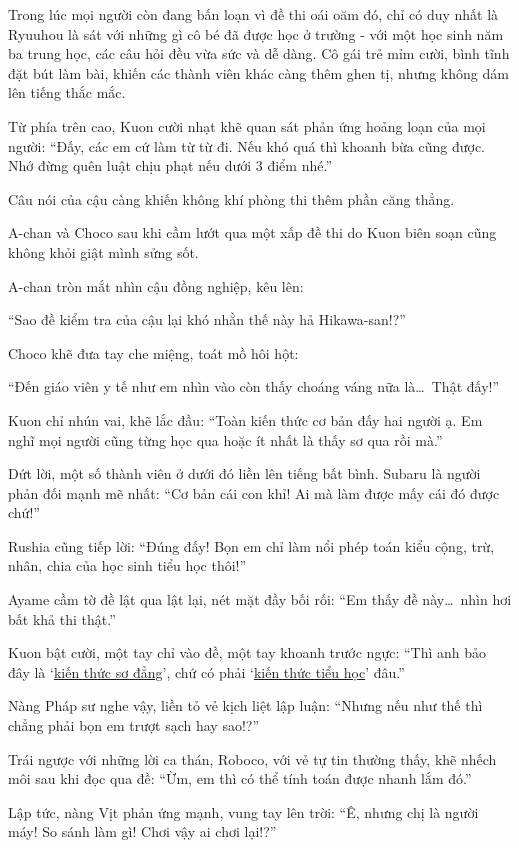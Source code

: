 \documentclass[../main.tex]{subfiles}
\begin{document}
Trong lúc mọi người còn đang bấn loạn vì đề thi oái oăm đó, chỉ có duy nhất là Ryuuhou là sát với những gì cô bé đã được học ở trường - với một học sinh năm ba trung học, các câu hỏi đều vừa sức và dễ dàng. Cô gái trẻ mỉm cười, bình tĩnh đặt bút làm bài, khiến các thành viên khác càng thêm ghen tị, nhưng không dám lên tiếng thắc mắc.

Từ phía trên cao, Kuon cười nhạt khẽ quan sát phản ứng hoảng loạn của mọi người: ``Đấy, các em cứ làm từ từ đi. Nếu khó quá thì khoanh bừa cũng được. Nhớ đừng quên luật chịu phạt nếu dưới 3 điểm nhé.''

Câu nói của cậu càng khiến không khí phòng thi thêm phần căng thẳng.

A-chan và Choco sau khi cầm lướt qua một xấp đề thi do Kuon biên soạn cũng không khỏi giật mình sửng sốt.

A-chan tròn mắt nhìn cậu đồng nghiệp, kêu lên:

``Sao đề kiểm tra của cậu lại khó nhằn thế này hả Hikawa-san!?''

Choco khẽ đưa tay che miệng, toát mồ hôi hột:

``Đến giáo viên y tế như em nhìn vào còn thấy choáng váng nữa là\dots\ Thật đấy!''

Kuon chỉ nhún vai, khẽ lắc đầu: ``Toàn kiến thức cơ bản đấy hai người ạ. Em nghĩ mọi người cũng từng học qua hoặc ít nhất là thấy sơ qua rồi mà.''

Dứt lời, một số thành viên ở dưới đó liền lên tiếng bất bình. Subaru là người phản đối mạnh mẽ nhất: ``Cơ bản cái con khỉ! Ai mà làm được mấy cái đó được chứ!''

Rushia cũng tiếp lời: ``Đúng đấy! Bọn em chỉ làm nổi phép toán kiểu cộng, trừ, nhân, chia của học sinh tiểu học thôi!''

Ayame cầm tờ đề lật qua lật lại, nét mặt đầy bối rối: ``Em thấy đề này\dots\ nhìn hơi bất khả thi thật.''

Kuon bật cười, một tay chỉ vào đề, một tay khoanh trước ngực: ``Thì anh bảo đây là `\uline{kiến thức sơ đẳng}', chứ có phải `\uline{kiến thức tiểu học}' đâu.''

Nàng Pháp sư nghe vậy, liền tỏ vẻ kịch liệt lập luận: ``Nhưng nếu như thế thì chẳng phải bọn em trượt sạch hay sao!?''

Trái ngược với những lời ca thán, Roboco, với vẻ tự tin thường thấy, khẽ nhếch môi sau khi đọc qua đề: ``Ừm, em thì có thể tính toán được nhanh lắm đó.''

Lập tức, nàng Vịt phản ứng mạnh, vung tay lên trời: ``Ê, nhưng chị là người máy! So sánh làm gì! Chơi vậy ai chơi lại!?''
\end{document}
